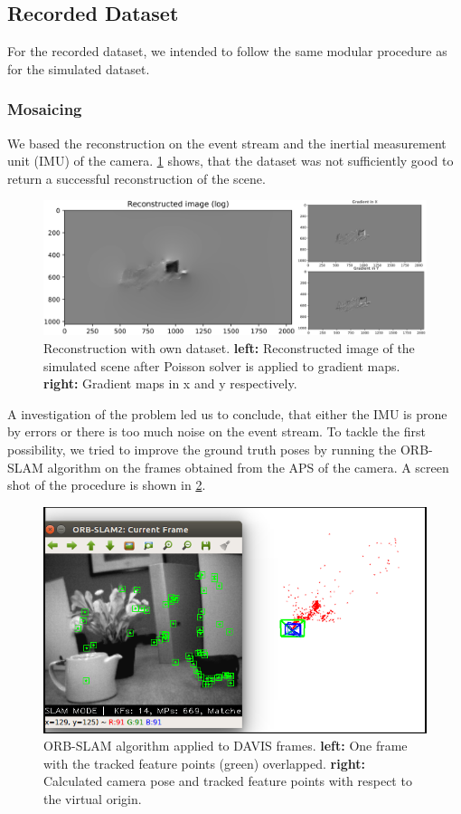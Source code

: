 \documentclass[10pt,twocolumn,letterpaper]{article}
\begin{document}
\subsection{Recorded Dataset}
For the recorded dataset, we intended to follow the same modular procedure as for the simulated dataset. 

\subsubsection{Mosaicing}
We based the reconstruction on the event stream and the inertial measurement unit (IMU) of the camera. \cref{fig:own_reconstruction} shows, that the dataset was not sufficiently good to return a successful reconstruction of the scene. 
\begin{figure}[h!]
	\centering
    \includegraphics[width=1.0\linewidth]{figures/reconstruction_redroom.png}
    \caption{Reconstruction with own dataset. \textbf{left:} Reconstructed image of the simulated scene after Poisson solver is applied to gradient maps. \textbf{right:} Gradient maps in x and y respectively.}
    \label{fig:own_reconstruction}
\end{figure}

A investigation of the problem led us to conclude, that either the IMU is prone by errors or there is too much noise on the event stream. To tackle the first possibility, we tried to improve the ground truth poses by running the ORB-SLAM algorithm on the frames obtained from the APS of the camera. A screen shot of the procedure is shown in \cref{fig:orbslam}. 

\begin{figure}[h!]
	\centering
    \includegraphics[width=1.0\linewidth]{figures/orbslam.png}
    \caption{ORB-SLAM algorithm applied to DAVIS frames. \textbf{left:} One frame with the tracked feature points (green) overlapped. \textbf{right:} Calculated camera pose and tracked feature points with respect to the virtual origin. }
    \label{fig:orbslam}
\end{figure}
\end{document}
